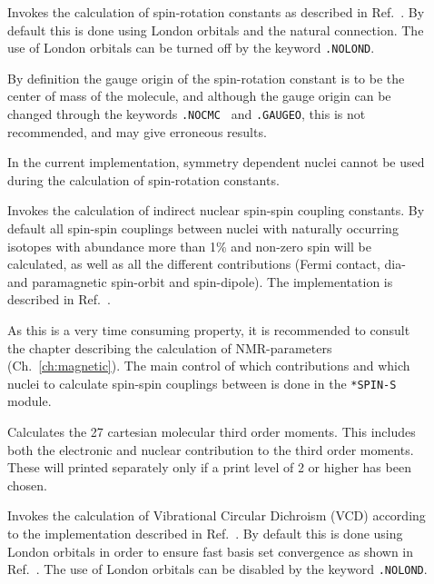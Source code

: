 \begin{description}
\item[] Invokes the calculation of
spin-rotation
constants as described in Ref.~\cite{jgkrthjcp105}. By default this is
done using London orbitals  and the
natural connection. The use of London
orbitals can be turned off by the keyword \verb|.NOLOND|.

By definition the gauge origin of the
spin-rotation constant is to be the
center of mass of the molecule, and although the
gauge origin can be
changed through the keywords \verb|.NOCMC | and \verb|.GAUGEO|, this
is not recommended, and may give erroneous results.

In the current implementation, symmetry dependent nuclei cannot be
used during the calculation of spin-rotation constants.

\item[] Invokes the calculation of indirect nuclear
spin-spin coupling constants. By default all
spin-spin couplings
between nuclei with naturally occurring isotopes with abundance more
than 1\% and non-zero spin will be calculated, as well as all the different
contributions (Fermi contact, dia- and paramagnetic spin-orbit and
spin-dipole). The implementation is described in
Ref.~\cite{ovhapjhjajsbpthjcp96}.

As this is a very time consuming property, it is recommended to
consult the chapter describing the calculation of NMR-parameters
(Ch.~\ref{ch:magnetic}). The main control of which
contributions and which nuclei to calculate spin-spin couplings
between is done in the \verb|*SPIN-S| module.

\item[] Calculates the 27 cartesian molecular third order
moments.
This includes both the electronic and nuclear contribution to the
third order moments. These will printed separately only if a print
level of 2 or higher has been chosen.

\item[] Invokes the calculation of Vibrational Circular
Dichroism (VCD)
according to the implementation described in
Ref.~\cite{klbpjthkrhjajjcp98}.  By default this is done using London
orbitals in order to
ensure fast basis set convergence as shown in
Ref.~\cite{klbpjthkrhjajjcp100}. The use of London
orbitals can be disabled by the keyword \verb|.NOLOND|.


\end{description}
